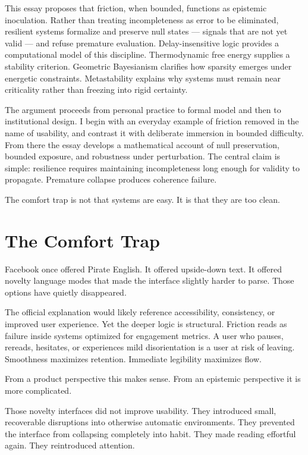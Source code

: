 \documentclass[12pt]{article}
\begin{document}
This essay proposes that friction, when bounded, functions as epistemic inoculation. Rather than treating incompleteness as error to be eliminated, resilient systems formalize and preserve null states — signals that are not yet valid — and refuse premature evaluation. Delay-insensitive logic provides a computational model of this discipline. Thermodynamic free energy supplies a stability criterion. Geometric Bayesianism clarifies how sparsity emerges under energetic constraints. Metastability explains why systems must remain near criticality rather than freezing into rigid certainty.

The argument proceeds from personal practice to formal model and then to institutional design. I begin with an everyday example of friction removed in the name of usability, and contrast it with deliberate immersion in bounded difficulty. From there the essay develops a mathematical account of null preservation, bounded exposure, and robustness under perturbation. The central claim is simple: resilience requires maintaining incompleteness long enough for validity to propagate. Premature collapse produces coherence failure.

The comfort trap is not that systems are easy. It is that they are too clean.

\section*{The Comfort Trap}

Facebook once offered Pirate English. It offered upside-down text. It offered novelty language modes that made the interface slightly harder to parse. Those options have quietly disappeared.

The official explanation would likely reference accessibility, consistency, or improved user experience. Yet the deeper logic is structural. Friction reads as failure inside systems optimized for engagement metrics. A user who pauses, rereads, hesitates, or experiences mild disorientation is a user at risk of leaving. Smoothness maximizes retention. Immediate legibility maximizes flow.

From a product perspective this makes sense. From an epistemic perspective it is more complicated.

Those novelty interfaces did not improve usability. They introduced small, recoverable disruptions into otherwise automatic environments. They prevented the interface from collapsing completely into habit. They made reading effortful again. They reintroduced attention.
\end{document}
